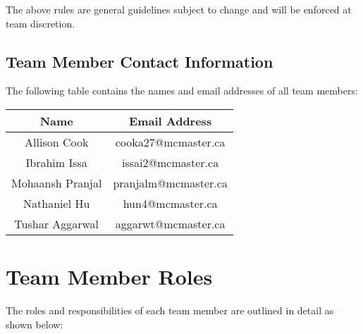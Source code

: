 \documentclass{article}
\begin{document}
The above rules are general guidelines subject to change and will be enforced at team discretion.

\subsection{Team Member Contact Information}

The following table contains the names and email addresses of all team members:

\begin{table}[ht!]
\centering
\label{TblContactInfo}
\begin{tabular}{| c | c |}
\hline
\textbf{Name} & \textbf{Email Address} \\
\hline
Allison Cook & cooka27@mcmaster.ca \\
\hline
Ibrahim Issa & issai2@mcmaster.ca \\
\hline
Mohaansh Pranjal & pranjalm@mcmaster.ca \\
\hline
Nathaniel Hu & hun4@mcmaster.ca \\
\hline
Tushar Aggarwal & aggarwt@mcmaster.ca \\
\hline
\end{tabular}
\end{table}

\section{Team Member Roles}

The roles and responsibilities of each team member are outlined in detail as shown below: \\
\end{document}
